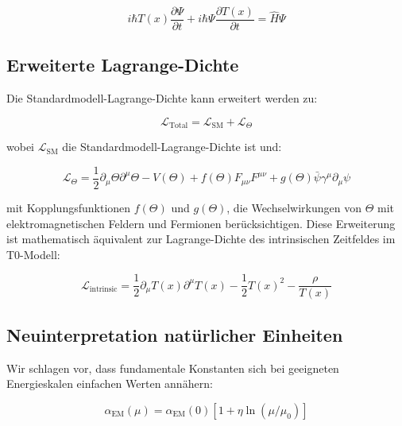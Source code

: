 \documentclass[12pt,a4paper]{article}
\newcommand{\Tfield}{T(x)}
\begin{document}
	\begin{equation}
		\label{eq:t0_schrodinger}
		i\hbar \Tfield \frac{\partial\Psi}{\partial t} + i\hbar \Psi \frac{\partial \Tfield}{\partial t} = \hat{H} \Psi
	\end{equation}
	
	\subsection{Erweiterte Lagrange-Dichte}
	\label{subsec:extended_lagrangian}
	
	Die Standardmodell-Lagrange-Dichte kann erweitert werden zu\cite{pascher_lagrange_2025}:
	
	\begin{equation}
		\label{eq:total_lagrangian}
		\mathcal{L}_{\text{Total}} = \mathcal{L}_{\text{SM}} + \mathcal{L}_{\Theta}
	\end{equation}
	
	wobei $\mathcal{L}_{\text{SM}}$ die Standardmodell-Lagrange-Dichte ist und:
	
	\begin{equation}
		\label{eq:theta_lagrangian}
		\mathcal{L}_{\Theta} = \frac{1}{2}\partial_{\mu}\Theta\partial^{\mu}\Theta - V(\Theta) + f(\Theta)F_{\mu\nu}F^{\mu\nu} + g(\Theta)\bar{\psi}\gamma^{\mu}\partial_{\mu}\psi
	\end{equation}
	
	mit Kopplungsfunktionen $f(\Theta)$ und $g(\Theta)$, die Wechselwirkungen von $\Theta$ mit elektromagnetischen Feldern und Fermionen berücksichtigen. Diese Erweiterung ist mathematisch äquivalent zur Lagrange-Dichte des intrinsischen Zeitfeldes im T0-Modell\cite{pascher_qft_2025}:
	
	\begin{equation}
		\label{eq:intrinsic_lagrangian}
		\mathcal{L}_{\text{intrinsic}} = \frac{1}{2} \partial_\mu \Tfield \partial^\mu \Tfield - \frac{1}{2}\Tfield^2 - \frac{\rho}{\Tfield}
	\end{equation}
	
	\subsection{Neuinterpretation natürlicher Einheiten}
	\label{subsec:reinterpretation}
	
	Wir schlagen vor, dass fundamentale Konstanten sich bei geeigneten Energieskalen einfachen Werten annähern\cite{pascher_alpha_2025}:
	
	\begin{equation}
		\label{eq:alpha_running}
		\alpha_{\text{EM}}(\mu) = \alpha_{\text{EM}}(0)[1 + \eta \ln(\mu/\mu_0)]
	\end{equation}
	
\end{document}

